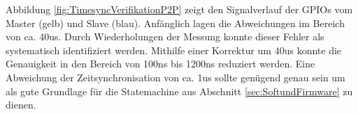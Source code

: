 Abbildung \ref{fig:TimesyncVerifikationP2P} zeigt den Signalverlauf der GPIOs vom Master (gelb) und Slave (blau). Anfänglich lagen die Abweichungen im Bereich von ca. 40us. Durch Wiederholungen der Messung konnte dieser Fehler als systematisch identifiziert werden. Mithilfe einer Korrektur um 40us konnte die Genauigkeit in den Bereich von 100ns bis 1200ns reduziert werden. Eine Abweichung der Zeitsynchronisation von ca. 1us sollte genügend genau sein um als gute Grundlage für die Statemachine aus Abschnitt \ref{sec:SoftundFirmware} zu dienen. 
 

